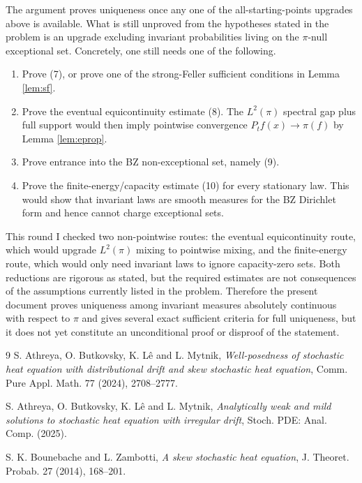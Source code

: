 \documentclass[12pt]{article}
\newcommand{\1}{\mathbf 1}
\begin{document}
The argument proves uniqueness once any one of the all-starting-points
upgrades above is available.  What is still unproved from the hypotheses
stated in the problem is an upgrade excluding invariant probabilities
living on the \(\pi\)-null exceptional set.  Concretely, one still needs
one of the following.

\begin{enumerate}
\item Prove (7), or prove one of the strong-Feller sufficient conditions in
Lemma \ref{lem:sf}.
\item Prove the eventual equicontinuity estimate (8).  The \(L^2(\pi)\)
spectral gap plus full support would then imply pointwise convergence
\(P_t f(x)\to\pi(f)\) by Lemma \ref{lem:eprop}.
\item Prove entrance into the BZ non-exceptional set, namely (9).
\item Prove the finite-energy/capacity estimate (10) for every stationary
law.  This would show that invariant laws are smooth measures for the BZ
Dirichlet form and hence cannot charge exceptional sets.
\end{enumerate}

This round I checked two non-pointwise routes: the eventual
equicontinuity route, which would upgrade \(L^2(\pi)\) mixing to pointwise
mixing, and the finite-energy route, which would only need invariant laws
to ignore capacity-zero sets.  Both reductions are rigorous as stated, but
the required estimates are not consequences of the assumptions currently
listed in the problem.  Therefore the present document proves uniqueness
among invariant measures absolutely continuous with respect to \(\pi\) and
gives several exact sufficient criteria for full uniqueness, but it does
not yet constitute an unconditional proof or disproof of the statement.

\begin{thebibliography}{9}
S. Athreya, O. Butkovsky, K. L\^e and L. Mytnik,
\emph{Well-posedness of stochastic heat equation with distributional drift
and skew stochastic heat equation}, Comm. Pure Appl. Math. 77 (2024),
2708--2777.

S. Athreya, O. Butkovsky, K. L\^e and L. Mytnik,
\emph{Analytically weak and mild solutions to stochastic heat equation with
irregular drift}, Stoch. PDE: Anal. Comp. (2025).

S. K. Bounebache and L. Zambotti,
\emph{A skew stochastic heat equation}, J. Theoret. Probab. 27 (2014),
168--201.
\end{thebibliography}
\end{document}
